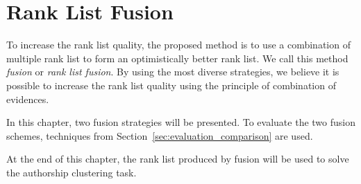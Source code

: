 \chapter{Rank List Fusion \label{sec:fusion}}

To increase the rank list quality, the proposed method is to use a combination of multiple rank list to form an optimistically better rank list.
We call this method \textit{fusion} or \textit{rank list fusion}.
By using the most diverse strategies, we believe it is possible to increase the rank list quality using the principle of combination of evidences.

In this chapter, two fusion strategies will be presented.
To evaluate the two fusion schemes, techniques from Section~\ref{sec:evaluation_comparison} are used.

At the end of this chapter, the rank list produced by fusion will be used to solve the authorship clustering task.





